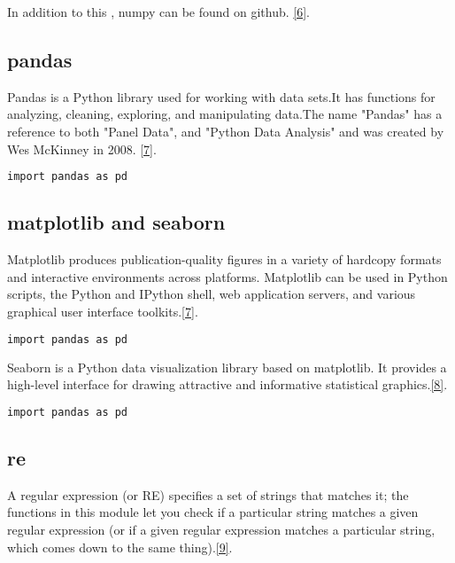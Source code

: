 \documentclass[onecolumn]{article}
\begin{document}
In addition to this , numpy can be found on github. \href{https://github.com/numpy/numpy}{ {[6]}}.

\subsection{pandas}

Pandas is a Python library used for working with data sets.It has functions for analyzing, cleaning, exploring, and manipulating data.The name "Pandas" has a reference to both "Panel Data", and "Python Data Analysis" and was created by Wes McKinney in 2008. \href{https://www.w3schools.com/python/pandas/pandas_intro.asp}{ {[7]}}.

\begin{lstlisting}[language=C, caption= pandas]
import pandas as pd
\end{lstlisting}

\subsection{matplotlib and seaborn}

Matplotlib produces publication-quality figures in a variety of hardcopy formats and interactive environments across platforms. Matplotlib can be used in Python scripts, the Python and IPython shell, web application servers, and various graphical user interface toolkits.\href{https://pypi.org/project/matplotlib/}{ {[7]}}.

\begin{lstlisting}[language=C, caption= matplotlib ]
import pandas as pd
\end{lstlisting}

Seaborn is a Python data visualization library based on matplotlib. It provides a high-level interface for drawing attractive and informative statistical graphics.\href{https://seaborn.pydata.org}{ {[8]}}.

\begin{lstlisting}[language=C, caption= seaborn]
import pandas as pd
\end{lstlisting}

\subsection{re}

A regular expression (or RE) specifies a set of strings that matches it; the functions in this module let you check if a particular string matches a given regular expression (or if a given regular expression matches a particular string, which comes down to the same thing).\href{https://docs.python.org/3/library/re.html}{ {[9]}}.
\end{document}

